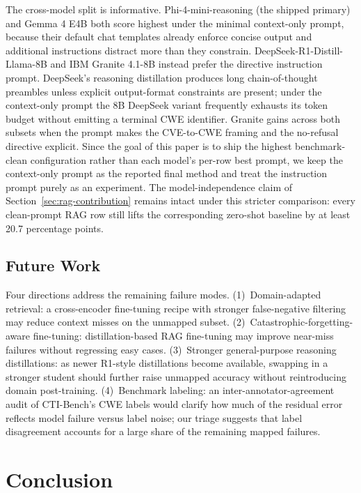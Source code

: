 The cross-model split is informative. Phi-4-mini-reasoning (the shipped primary) and Gemma 4 E4B both score highest under the minimal context-only prompt, because their default chat templates already enforce concise output and additional instructions distract more than they constrain. DeepSeek-R1-Distill-Llama-8B and IBM Granite 4.1-8B instead prefer the directive instruction prompt. DeepSeek's reasoning distillation produces long chain-of-thought preambles unless explicit output-format constraints are present; under the context-only prompt the 8B DeepSeek variant frequently exhausts its token budget without emitting a terminal CWE identifier. Granite gains across both subsets when the prompt makes the CVE-to-CWE framing and the no-refusal directive explicit. Since the goal of this paper is to ship the highest benchmark-clean configuration rather than each model's per-row best prompt, we keep the context-only prompt as the reported final method and treat the instruction prompt purely as an experiment. The model-independence claim of Section~\ref{sec:rag-contribution} remains intact under this stricter comparison: every clean-prompt RAG row still lifts the corresponding zero-shot baseline by at least 20.7 percentage points.

\subsection{Future Work}
\label{sec:future-work}

Four directions address the remaining failure modes. (1)~Domain-adapted retrieval: a cross-encoder fine-tuning recipe with stronger false-negative filtering \cite{moreira-2024} may reduce context misses on the unmapped subset. (2)~Catastrophic-forgetting-aware fine-tuning: distillation-based RAG fine-tuning \cite{huang-2025} may improve near-miss failures without regressing easy cases. (3)~Stronger general-purpose reasoning distillations: as newer R1-style distillations become available, swapping in a stronger student should further raise unmapped accuracy without reintroducing domain post-training. (4)~Benchmark labeling: an inter-annotator-agreement audit of CTI-Bench's CWE labels would clarify how much of the residual error reflects model failure versus label noise; our triage suggests that label disagreement accounts for a large share of the remaining mapped failures.

\section{Conclusion}

